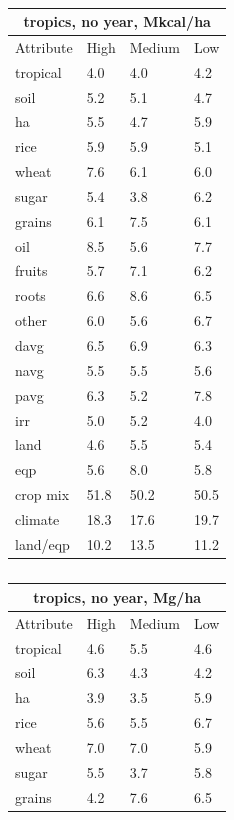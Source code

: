 \documentclass[12pt]{article}
\begin{document}
\begin{table}[h!]
\parbox{.45\linewidth} {
\centering
\begin{tabular}{llll}
\toprule
\multicolumn{4}{c}{\textbf{tropics, no year, Mkcal/ha}} \\
\midrule
Attribute & High & Medium & Low \\
\midrule
tropical & 4.0 & 4.0 & 4.2 \\
soil & 5.2 & 5.1 & 4.7 \\
ha & 5.5 & 4.7 & 5.9 \\
rice & 5.9 & 5.9 & 5.1 \\
wheat & 7.6 & 6.1 & 6.0 \\
sugar & 5.4 & 3.8 & 6.2 \\
grains & 6.1 & 7.5 & 6.1 \\
oil & 8.5 & 5.6 & 7.7 \\
fruits & 5.7 & 7.1 & 6.2 \\
roots & 6.6 & 8.6 & 6.5 \\
other & 6.0 & 5.6 & 6.7 \\
davg & 6.5 & 6.9 & 6.3 \\
navg & 5.5 & 5.5 & 5.6 \\
pavg & 6.3 & 5.2 & 7.8 \\
irr & 5.0 & 5.2 & 4.0 \\
land & 4.6 & 5.5 & 5.4 \\
eqp & 5.6 & 8.0 & 5.8 \\
\midrule
crop mix & 51.8 & 50.2 & 50.5 \\
climate & 18.3 & 17.6 & 19.7 \\
land/eqp & 10.2 & 13.5 & 11.2 \\
\bottomrule
\end{tabular}
\caption{ }
\label{k.ny.trop_percentages}
}
\parbox{.45\linewidth} {
\centering
\begin{tabular}{llll}
\toprule
\multicolumn{4}{c}{\textbf{tropics, no year, Mg/ha}} \\
\midrule
Attribute & High & Medium & Low \\
\midrule
tropical & 4.6  & 5.5 & 4.6 \\
soil & 6.3 & 4.3 & 4.2 \\
ha & 3.9 & 3.5 & 5.9 \\
rice & 5.6 & 5.5 & 6.7 \\
wheat & 7.0 & 7.0 & 5.9 \\
sugar & 5.5 & 3.7 & 5.8 \\
grains & 4.2 & 7.6 & 6.5 \\

\end{tabular}}
\end{table}
\end{document}
